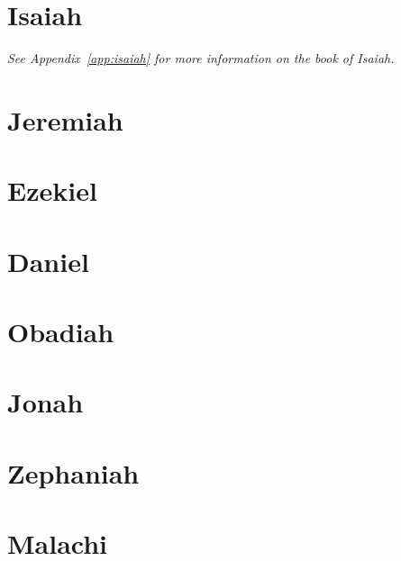 \documentclass[twoside]{book}
\newcommand\englishchaptertitle{}
\newcommand\hebrewchaptertitle{}
\newcommand\book[2]{%
    \chapter[#1\hfill#2~~~]{#1}%
    \renewcommand\englishchaptertitle{#1}%
    \renewcommand\hebrewchaptertitle{#2}%
    \thispagestyle{empty}%
}
\newcommand\Hebrew[1]{{\sblh #1}}
\begin{document}
    \book{Isaiah}{\Hebrew{ישעה}}
    {\noindent\textit{\small See Appendix~\ref{app:isaiah} for more information on the book of Isaiah.}}
    
    
    
    
    
    
    
    \book{Jeremiah}{\Hebrew{ירמיה}}
    
    
    
    
    
    
    
    
    \book{Ezekiel}{\Hebrew{יחזקאל}}
    
    
    \book{Daniel}{\Hebrew{דניאל}}
    
    
    
    
    \book{Obadiah}{\Hebrew{עבדיה}}
    
    
    \book{Jonah}{\Hebrew{יונה}}
    
    
    \book{Zephaniah}{\Hebrew{צפניה}}
    
    
    \book{Malachi}{\Hebrew{מלאכי}}
    
    ~\clearpage\thispagestyle{empty}
    \appendix
    
    
    
    
    
    
\end{document}
